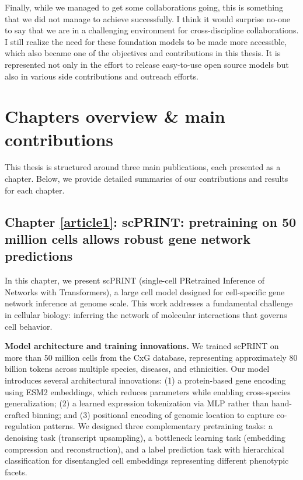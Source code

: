 Finally, while we managed to get some collaborations going, this is something that we did not manage to achieve successfully. I think it would surprise no-one to say that we are in a challenging environment for cross-discipline collaborations. I still realize the need for these foundation models to be made more accessible, which also became one of the objectives and contributions in this thesis. It is represented not only in the effort to release easy-to-use open source models but also in various side contributions and outreach efforts.

\section{Chapters overview \& main contributions}

This thesis is structured around three main publications, each presented as a chapter. Below, we provide detailed summaries of our contributions and results for each chapter.

\subsection{Chapter \ref{article1}: scPRINT: pretraining on 50 million cells allows robust gene network predictions}

In this chapter, we present \gls{scPRINT} (single-cell PRetrained Inference of Networks with Transformers), a large cell model designed for cell-specific gene network inference at genome scale. This work addresses a fundamental challenge in cellular biology: inferring the network of molecular interactions that governs cell behavior.

\textbf{Model architecture and training innovations.} We trained \gls{scPRINT} on more than 50 million cells from the \gls{CxG} database, representing approximately 80 billion tokens across multiple species, diseases, and ethnicities. Our model introduces several architectural innovations: (1) a protein-based gene encoding using \gls{ESM}2 embeddings, which reduces parameters while enabling cross-species generalization; (2) a learned expression tokenization via \gls{MLP} rather than hand-crafted binning; and (3) positional encoding of genomic location to capture co-regulation patterns. We designed three complementary pretraining tasks: a denoising task (transcript upsampling), a bottleneck learning task (embedding compression and reconstruction), and a label prediction task with hierarchical classification for disentangled cell embeddings representing different phenotypic facets.

